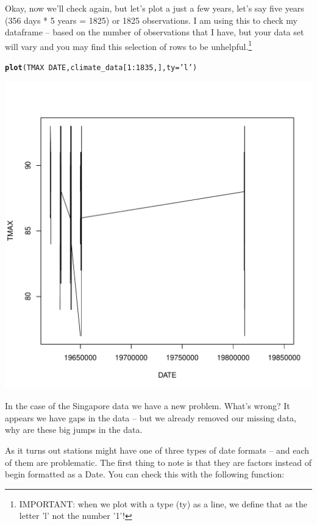 \documentclass{article}\usepackage[]{graphicx}\usepackage[]{color}
\makeatletter
\def\maxwidth{ %
  \ifdim\Gin@nat@width>\linewidth
    \linewidth
  \else
    \Gin@nat@width
  \fi
}
\newcommand{\hlnum}[1]{\textcolor[rgb]{0.686,0.059,0.569}{#1}}%
\newcommand{\hlstr}[1]{\textcolor[rgb]{0.192,0.494,0.8}{#1}}%
\newcommand{\hlopt}[1]{\textcolor[rgb]{0,0,0}{#1}}%
\newcommand{\hlstd}[1]{\textcolor[rgb]{0.345,0.345,0.345}{#1}}%
\newcommand{\hlkwc}[1]{\textcolor[rgb]{0.333,0.667,0.333}{#1}}%
\newcommand{\hlkwd}[1]{\textcolor[rgb]{0.737,0.353,0.396}{\textbf{#1}}}%
\newenvironment{kframe}{%
 \def\at@end@of@kframe{}%
 \ifinner\ifhmode%
  \def\at@end@of@kframe{\end{minipage}}%
  \begin{minipage}{\columnwidth}%
 \fi\fi%
 \def\FrameCommand##1{\hskip\@totalleftmargin \hskip-\fboxsep
 \colorbox{shadecolor}{##1}\hskip-\fboxsep
     \hskip-\linewidth \hskip-\@totalleftmargin \hskip\columnwidth}%
 \MakeFramed {\advance\hsize-\width
   \@totalleftmargin\z@ \linewidth\hsize
   \@setminipage}}%
 {\par\unskip\endMakeFramed%
 \at@end@of@kframe}
\newenvironment{knitrout}{}{} %
\makeatother
\begin{document}
Okay, now we'll check again, but let's plot a just a few years, let's say five years (356 days * 5 years = 1825) or 1825 observations. I am using this to check my dataframe -- based on the number of observations that I have, but your data set will vary and you may find this selection of rows to be unhelpful.\footnote{IMPORTANT: when we plot with a type (ty) as a line, we define that as the letter 'l' not the number '1'!}

\begin{knitrout}
\color{fgcolor}\begin{kframe}
\begin{alltt}
\hlkwd{plot}\hlstd{(TMAX}\hlopt{~}\hlstd{DATE, climate_data[}\hlnum{1}\hlopt{:}\hlnum{1835}\hlstd{,],} \hlkwc{ty}\hlstd{=}\hlstr{'l'}\hlstd{)}
\end{alltt}
\end{kframe}
\includegraphics[width=\maxwidth]{figure/unnamed-chunk-9-1} 

\end{knitrout}

In the case of the Singapore data we have a new problem. What's wrong? It appears we have gaps in the data -- but we already removed our missing data, why are these big jumps in the data.

As it turns out stations might have one of three types of date formats -- and each of them are problematic. The first thing to note is that they are factors instead of begin formatted as a Date. You can check this with the following function:
\end{document}
